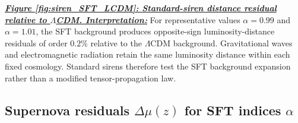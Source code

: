 \documentclass[12pt]{article}
\begin{document}
\textit{\underline{\textbf{
Figure \ref{fig:siren_SFT_LCDM}:
\textit{Standard-siren distance residual relative to $\Lambda$CDM.}
Interpretation:}}}
For representative values $\alpha=0.99$ and $\alpha=1.01$, the SFT
background produces opposite-sign luminosity-distance residuals of
order $0.2\%$ relative to the $\Lambda$CDM background. Gravitational
waves and electromagnetic radiation retain the same luminosity
distance within each fixed cosmology. Standard sirens therefore test
the SFT background expansion rather than a modified tensor-propagation
law.


\subsection{Supernova residuals $\Delta\mu(z)$ for SFT indices $\alpha$}
\end{document}
